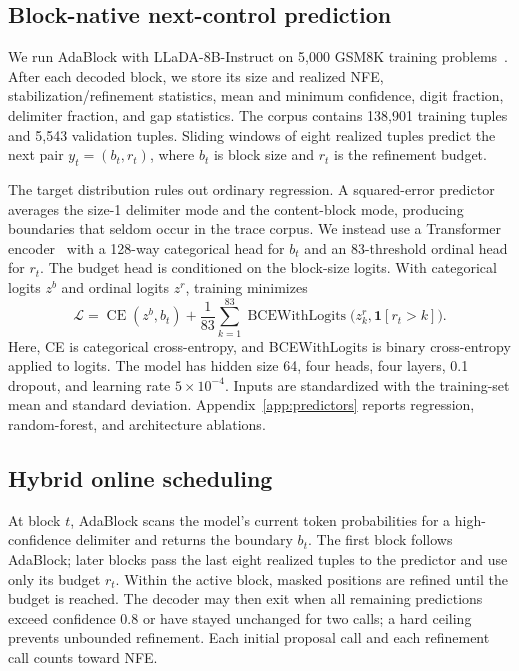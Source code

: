 \documentclass{article}
\newcommand{\nfe}{NFE}
\begin{document}
\subsection{Block-native next-control prediction}
\label{sec:predictor}

We run AdaBlock with LLaDA-8B-Instruct on 5{,}000 GSM8K training problems~\citep{cobbe2021gsm8k}. After each decoded block, we store its size and realized \nfe{}, stabilization/refinement statistics, mean and minimum confidence, digit fraction, delimiter fraction, and gap statistics. The corpus contains 138{,}901 training tuples and 5{,}543 validation tuples. Sliding windows of eight realized tuples predict the next pair $y_t=(b_t,r_t)$, where $b_t$ is block size and $r_t$ is the refinement budget.

The target distribution rules out ordinary regression. A squared-error predictor averages the size-1 delimiter mode and the content-block mode, producing boundaries that seldom occur in the trace corpus. We instead use a Transformer encoder~\citep{vaswani2017attention} with a 128-way categorical head for $b_t$ and an 83-threshold ordinal head for $r_t$. The budget head is conditioned on the block-size logits. With categorical logits $z^b$ and ordinal logits $z^r$, training minimizes
\begin{equation}
 \mathcal{L}=\operatorname{CE}(z^b,b_t)
 +\frac{1}{83}\sum_{k=1}^{83}\operatorname{BCEWithLogits}
       \bigl(z^r_k,\mathbf{1}[r_t>k]\bigr).
 \label{eq:loss}
\end{equation}
Here, CE is categorical cross-entropy, and BCEWithLogits is binary cross-entropy applied to logits. The model has hidden size 64, four heads, four layers, 0.1 dropout, and learning rate $5\times10^{-4}$. Inputs are standardized with the training-set mean and standard deviation. Appendix~\ref{app:predictors} reports regression, random-forest, and architecture ablations.

\subsection{Hybrid online scheduling}
\label{sec:scheduler}

At block $t$, AdaBlock scans the model's current token probabilities for a high-confidence delimiter and returns the boundary $b_t$. The first block follows AdaBlock; later blocks pass the last eight realized tuples to the predictor and use only its budget $r_t$. Within the active block, masked positions are refined until the budget is reached. The decoder may then exit when all remaining predictions exceed confidence 0.8 or have stayed unchanged for two calls; a hard ceiling prevents unbounded refinement. Each initial proposal call and each refinement call counts toward \nfe{}.
\end{document}
